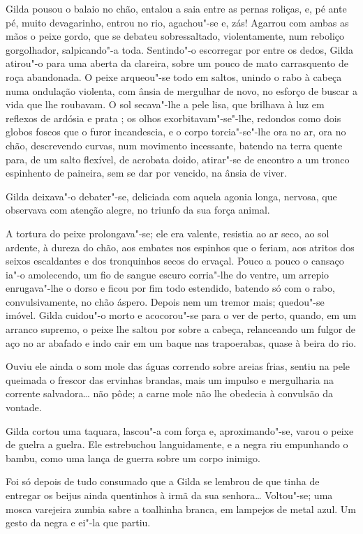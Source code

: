 Gilda pousou o balaio no chão, entalou a saia entre as pernas roliças,
e, pé ante pé, muito devagarinho, entrou no rio, agachou"-se e, zás!
Agarrou com ambas as mãos o peixe gordo, que se debateu sobressaltado,
violentamente, num reboliço gorgolhador, salpicando"-a toda. Sentindo"-o
escorregar por entre os dedos, Gilda atirou"-o para uma aberta da
clareira, sobre um pouco de mato carrasquento de roça abandonada. O
peixe arqueou"-se todo em saltos, unindo o rabo à cabeça numa ondulação
violenta, com ânsia de mergulhar de novo, no esforço de buscar a vida
que lhe roubavam. O sol secava"-lhe a pele lisa, que brilhava à luz em
reflexos de ardósia e prata ; os olhos exorbitavam"-se"-lhe, redondos como
dois globos foscos que o furor incandescia, e o corpo torcia"-se"-lhe ora
no ar, ora no chão, descrevendo curvas, num movimento incessante,
batendo na terra quente para, de um salto flexível, de acrobata doido,
atirar"-se de encontro a um tronco espinhento de paineira, sem se dar por
vencido, na ânsia de viver.

Gilda deixava"-o debater"-se, deliciada com aquela agonia longa, nervosa,
que observava com atenção alegre, no triunfo da sua força animal.

A tortura do peixe prolongava"-se; ele era valente, resistia ao ar seco,
ao sol ardente, à dureza do chão, aos embates nos espinhos que o feriam,
aos atritos dos seixos escaldantes e dos tronquinhos secos do ervaçal.
Pouco a pouco o cansaço ia"-o amolecendo, um fio de sangue escuro
corria"-lhe do ventre, um arrepio enrugava"-lhe o dorso e ficou por fim
todo estendido, batendo só com o rabo, convulsivamente, no chão áspero.
Depois nem um tremor mais; quedou"-se imóvel. Gilda cuidou"-o morto e
acocorou"-se para o ver de perto, quando, em um arranco supremo, o peixe
lhe saltou por sobre a cabeça, relanceando um fulgor de aço no ar
abafado e indo cair em um baque nas trapoerabas, quase à beira do rio.

Ouviu ele ainda o som mole das águas correndo sobre areias frias, sentiu
na pele queimada o frescor das ervinhas brandas, mais um impulso e
mergulharia na corrente salvadora\ldots{} não pôde; a carne mole não lhe
obedecia à convulsão da vontade.

Gilda cortou uma taquara, lascou"-a com força e, aproximando"-se, varou o
peixe de guelra a guelra. Ele estrebuchou languidamente, e a negra riu
empunhando o bambu, como uma lança de guerra sobre um corpo inimigo.

Foi só depois de tudo consumado que a Gilda se lembrou de que tinha de
entregar os beijus ainda quentinhos à irmã da sua senhora\ldots{} Voltou"-se;
uma mosca varejeira zumbia sabre a toalhinha branca, em lampejos de
metal azul. Um gesto da negra e ei"-la que partiu.

